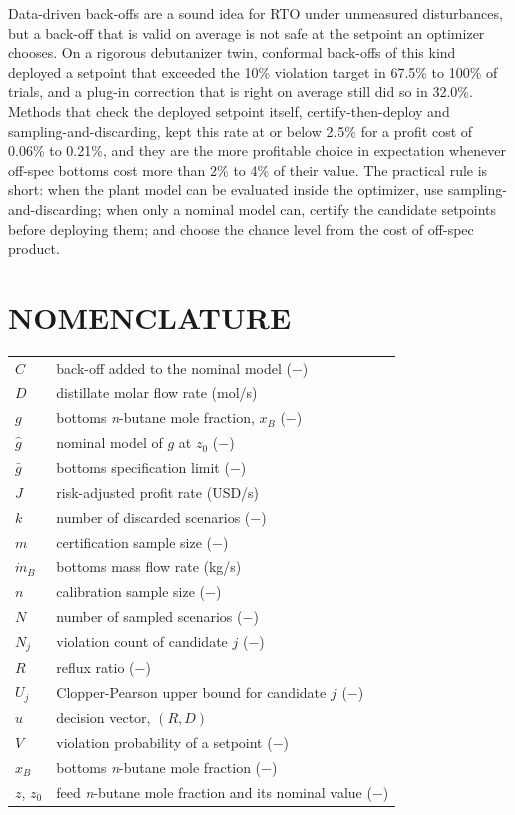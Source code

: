 \documentclass[12pt]{article}
\begin{document}
Data-driven back-offs are a sound idea for RTO under unmeasured disturbances, but a back-off that
is valid on average is not safe at the setpoint an optimizer chooses. On a rigorous debutanizer twin,
conformal back-offs of this kind deployed a setpoint that exceeded the 10\% violation target in 67.5\%
to 100\% of trials, and a plug-in correction that is right on average still did so in 32.0\%.
Methods that check the deployed setpoint itself, certify-then-deploy and sampling-and-discarding,
kept this rate at or below 2.5\% for a profit cost of 0.06\% to 0.21\%, and they are the more profitable
choice in expectation whenever off-spec bottoms cost more than 2\% to 4\% of their value. The practical
rule is short: when the plant model can be evaluated inside the optimizer, use
sampling-and-discarding; when only a nominal model can, certify the candidate setpoints before
deploying them; and choose the chance level from the cost of off-spec product.

\section*{NOMENCLATURE}
\begingroup\small
\begin{tabular}{@{}p{}p{}@{}}
$C$ & back-off added to the nominal model ($-$) \\
$D$ & distillate molar flow rate (mol/s) \\
$g$ & bottoms \textit{n}-butane mole fraction, $x_B$ ($-$) \\
$\hat g$ & nominal model of $g$ at $z_0$ ($-$) \\
$\bar g$ & bottoms specification limit ($-$) \\
$J$ & risk-adjusted profit rate (USD/s) \\
$k$ & number of discarded scenarios ($-$) \\
$m$ & certification sample size ($-$) \\
$\dot m_B$ & bottoms mass flow rate (kg/s) \\
$n$ & calibration sample size ($-$) \\
$N$ & number of sampled scenarios ($-$) \\
$N_j$ & violation count of candidate $j$ ($-$) \\
$R$ & reflux ratio ($-$) \\
$U_j$ & Clopper-Pearson upper bound for candidate $j$ ($-$) \\
$u$ & decision vector, $(R, D)$ \\
$V$ & violation probability of a setpoint ($-$) \\
$x_B$ & bottoms \textit{n}-butane mole fraction ($-$) \\
$z$, $z_0$ & feed \textit{n}-butane mole fraction and its nominal value ($-$) \\
\end{tabular}
\end{document}

